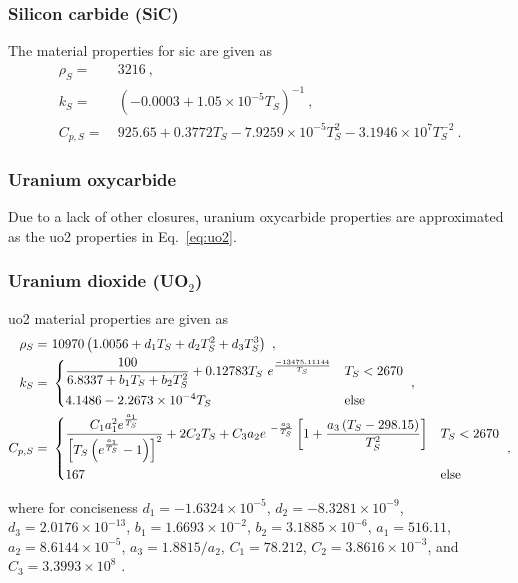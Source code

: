 \begin{appendices}
\subsubsection*{Silicon carbide (SiC)}
The material properties for \gls{sic} are given as \cite{snead,xin_wang_thesis,tecdoc1694,sun}
\begin{subequations}
\begin{align}
\rho_S=&\ 3216\ ,\\
k_S =&\ \left(-0.0003+1.05\times10^{-5}T_S\right)^{-1}\ ,\\ 
\label{eq:CpSiC}
C_{p,S} =&\ 925.65+0.3772T_S-7.9259\times10^{-5}T_S^2-3.1946\times10^7T_S^{-2}\ .
\end{align}
\end{subequations}

\subsubsection*{Uranium oxycarbide}
Due to a lack of other closures, uranium oxycarbide properties are approximated as the \gls{uo2} properties in Eq.\ \eqref{eq:uo2}.

\subsubsection*{Uranium dioxide (UO$_2$)}
\gls{uo2} material properties are given as
\begin{subequations}
\label{eq:uo2}
\begin{align}
\rho_S=&\ 10970\left(1.0056+d_1T_S+d_2T_S^2+d_3T_S^3\right)\ ,\\
k_S =&\ \begin{dcases}\frac{100}{6.8337+b_1T_S+b_2T_S^2}+0.12783T_S\ e^\frac{-13475.11144}{T_S} & T_S<2670\\
4.1486-2.2673\times10^{-4}T_S & \text{else}\end{dcases}\ , \\
C_{p,S}=&\ \begin{dcases} \frac{C_1a_1^2e^\frac{a_1}{T_S}}{\left\lbrack T_S\left(e^\frac{a_1}{T_S}-1\right)\right\rbrack^2}+2 C_2T_S+C_3a_2e^{\ -\frac{a_3}{T_S}}\left\lbrack1+\frac{a_3\left(T_S-298.15\right)}{T_S^2}\right\rbrack & T_S<2670\\
167 & \text{else}\end{dcases}\ ,
\end{align}
\end{subequations}

\noindent where for conciseness \(d_1=-1.6324\times10^{-5}\), \(d_2=-8.3281\times10^{-9}\), \(d_3=2.0176\times10^{-13}\), \(b_1=1.6693\times10^{-2}\), \(b_2=3.1885\times10^{-6}\), \(a_1=516.11\), \(a_2=8.6144\times10^{-5}\), \(a_3=1.8815/a_2\), \(C_1=78.212\), \(C_2=3.8616\times10^{-3}\), and \(C_3=3.3993\times10^8\) \cite{fink}.


\end{appendices}
